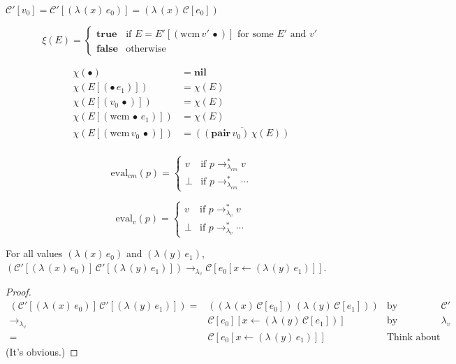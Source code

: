 \documentclass[ms,electronic,twosidetoc,letterpaper,chaptercenter,parttop]{byumsphd}
\newcommand{\lv}{$\lambda_v$}
\newcommand{\nil}{\mathbf{nil}}
\newcommand{\pair}[2]{((\mathbf{pair}\,#1)\,#2)}
\newcommand{\eval}[1]{\overline{#1}}
\newcommand{\lvrr}{\rightarrow_{\lambda_v}}
\newcommand{\lvrrs}{\rightarrow_{\lambda_v}^{*}}
\newcommand{\cmrrs}{\rightarrow_{\lambda_{cm}}^{*}}
\newcommand{\C}[1]{\mathcal{C}[#1]}
\newcommand{\Cp}[1]{\mathcal{C}'[#1]}
\newcommand{\abs}[2]{(\lambda\,(#1)\,#2)}
\newcommand{\app}[2]{(#1\,#2)}
\newcommand{\wcm}[2]{(\mathrm{wcm}\,#1\,#2)}
\newcommand{\hole}{\bullet}
\begin{document}
\begin{defn}
$\Cp{v_0}=\Cp{\abs{x}{e_0}}=\abs{x}{\C{e_0}}$
\end{defn}

\begin{defn}
\[
\xi(E)=\begin{cases}
\mathbf{true} &\text{if $E=E'[\wcm{v'}{\hole}]$ for some $E'$ and $v'$}\\
\mathbf{false} &\text{otherwise}
\end{cases}
\]
\end{defn}

\begin{defn}
\begin{align*}
\chi(\hole)               &= \nil\\
\chi(E[\app{\hole}{e_1}]) &= \chi(E)\\
\chi(E[\app{v_0}{\hole}]) &= \chi(E)\\
\chi(E[\wcm{\hole}{e_1}]) &= \chi(E)\\
\chi(E[\wcm{v_0}{\hole}]) &= \eval{\pair{v_0}{\chi(E)}}\\
\end{align*}
\end{defn}

\begin{defn}
\[
\mathrm{eval}_{cm}(p)=\begin{cases}
v     &\text{if $p\cmrrs v$}\\
\perp &\text{if $p\cmrrs\cdots$}
\end{cases}
\]
\end{defn}

\begin{defn}
\[
\mathrm{eval}_{v}(p)=\begin{cases}
v     &\text{if $p\lvrrs v$}\\
\perp &\text{if $p\lvrrs\cdots$}
\end{cases}
\]
\end{defn}

\begin{lemma}
\label{cm-app}
For all values $\abs{x}{e_0}$ and $\abs{y}{e_1}$, $\app{\Cp{\abs{x}{e_0}}}{\Cp{\abs{y}{e_1}}}\lvrr\C{e_0[x\leftarrow \abs{y}{e_1}]}$.
\end{lemma}

\begin{proof}
\begin{align*}
\app{\Cp{\abs{x}{e_0}}}{\Cp{\abs{y}{e_1}}} = &\app{\abs{x}{\C{e_0}}}{\abs{y}{\C{e_1}}}&\text{by definition of $\mathcal{C}'$}\\
                                       \lvrr &\C{e_0}[x\leftarrow \abs{y}{\C{e_1}}]&\text{by semantics of \lv}\\
                                           = &\C{e_0[x\leftarrow \abs{y}{e_1}}]&\text{Think about it.}
\end{align*}
(It's obvious.)
\end{proof}
\end{document}
